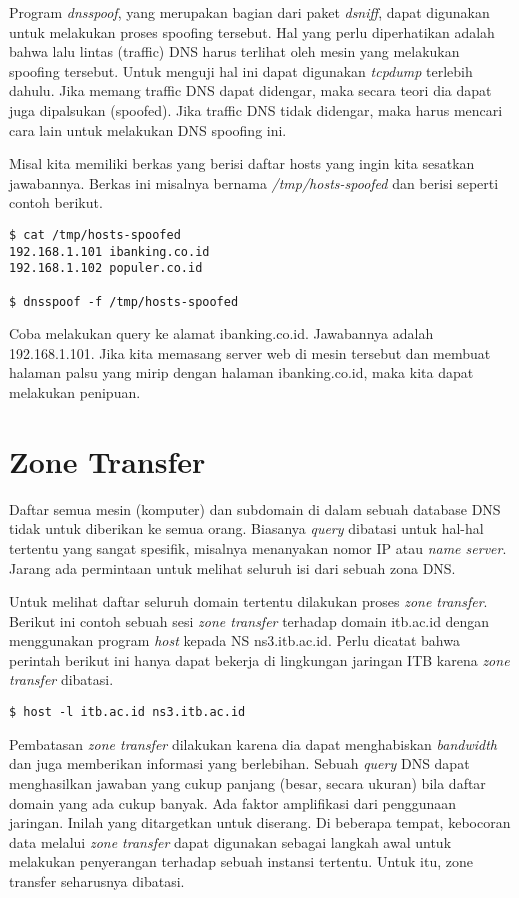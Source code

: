 Program {\em dnsspoof}, yang merupakan bagian dari paket {\em dsniff}, dapat
digunakan untuk melakukan proses spoofing tersebut. Hal yang perlu diperhatikan
adalah bahwa lalu lintas (traffic) DNS harus terlihat oleh mesin yang melakukan
spoofing tersebut. Untuk menguji hal ini dapat digunakan {\em tcpdump} terlebih
dahulu. Jika memang traffic DNS dapat didengar, maka secara teori dia dapat
juga dipalsukan (spoofed). Jika traffic DNS tidak didengar, maka harus mencari
cara lain untuk melakukan DNS spoofing ini.

Misal kita memiliki berkas yang berisi daftar hosts yang ingin kita sesatkan
jawabannya. Berkas ini misalnya bernama {\em /tmp/hosts-spoofed} dan berisi
seperti contoh berikut.

\begin{verbatim}
$ cat /tmp/hosts-spoofed
192.168.1.101 ibanking.co.id
192.168.1.102 populer.co.id

$ dnsspoof -f /tmp/hosts-spoofed
\end{verbatim}

Coba melakukan query ke alamat ibanking.co.id. Jawabannya adalah 192.168.1.101.
Jika kita memasang server web di mesin tersebut dan membuat halaman palsu yang
mirip dengan halaman ibanking.co.id, maka kita dapat melakukan penipuan.

\section{Zone Transfer}
Daftar semua mesin (komputer) dan subdomain di dalam sebuah database DNS tidak
untuk diberikan ke semua orang. Biasanya {\em query} dibatasi untuk hal-hal
tertentu yang sangat spesifik, misalnya menanyakan nomor IP atau {\em name
server}. Jarang ada permintaan untuk melihat seluruh isi dari sebuah zona DNS.

Untuk melihat daftar seluruh domain tertentu dilakukan proses {\em zone
transfer}. Berikut ini contoh sebuah sesi {\em zone transfer} terhadap domain
itb.ac.id dengan menggunakan program {\em host} kepada NS ns3.itb.ac.id. Perlu
dicatat bahwa perintah berikut ini hanya dapat bekerja di lingkungan jaringan
ITB karena {\em zone transfer} dibatasi.

\begin{verbatim}
$ host -l itb.ac.id ns3.itb.ac.id
\end{verbatim}

Pembatasan {\em zone transfer} dilakukan karena dia dapat menghabiskan {\em
bandwidth} dan juga memberikan informasi yang berlebihan. Sebuah {\em query}
DNS dapat menghasilkan jawaban yang cukup panjang (besar, secara ukuran) bila
daftar domain yang ada cukup banyak. Ada faktor amplifikasi dari penggunaan
jaringan. Inilah yang ditargetkan untuk diserang. Di beberapa tempat,
kebocoran data melalui {\em zone transfer} dapat digunakan sebagai langkah 
awal untuk melakukan penyerangan terhadap sebuah instansi tertentu. Untuk itu,
zone transfer seharusnya dibatasi.

